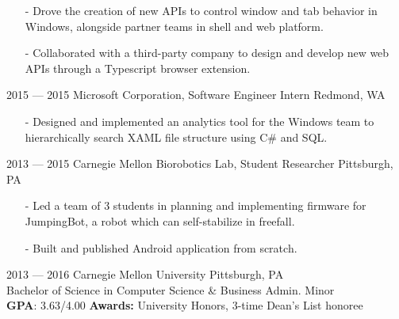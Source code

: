 \documentclass[print]{template/friggeri-cv}
\begin{document}
\begin{entrylist}
{\begin{itemize}[leftmargin=*,itemsep=4pt]
                \item[-] Drove the creation of new APIs to control window and tab behavior in Windows, alongside partner teams in shell and web platform.
                \item[-] Collaborated with a third-party company to design and develop new web APIs through a Typescript browser extension.
             \end{itemize}}
        \entry
            {2015 --- 2015}
            {Microsoft Corporation, {\normalfont Software Engineer Intern}}
            {Redmond, WA}
            {\begin{itemize}[leftmargin=*,itemsep=4pt]
                \item[-] Designed and implemented an analytics tool for the Windows team to hierarchically search XAML file structure using C\# and SQL.
             \end{itemize}}
        \entry
            {2013 --- 2015}
            {Carnegie Mellon Biorobotics Lab, {\normalfont Student Researcher}}
            {Pittsburgh, PA}
            {\begin{itemize}[leftmargin=*,itemsep=4pt]
                \item[-] Led a team of 3 students in planning and implementing firmware for JumpingBot, a robot which can self-stabilize in freefall.
                \item[-] Built and published Android application from scratch.
             \end{itemize}}
        \entry
            {2013 --- 2016}
            {Carnegie Mellon University}
            {Pittsburgh, PA}
            {\\ Bachelor of Science in Computer Science \& Business Admin. Minor \\
            \textbf{GPA}: 3.63/4.00 \quad \textbf{Awards:} University Honors, 3-time Dean's List honoree}
    \end{entrylist}
\end{document}
